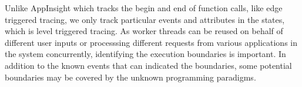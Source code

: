 Unlike AppInsight which tracks the begin and end of function calls, like edge triggered tracing, we only track particular events and attributes in the states, which is level triggered tracing. 
As worker threads can be reused on behalf of different user inputs or processsing different requests from various applications in the system concurrently,
identifying the execution boundaries is important.
In addition to the known events that can indicated the boundaries, some potential boundaries may be covered by the unknown programming paradigms.


